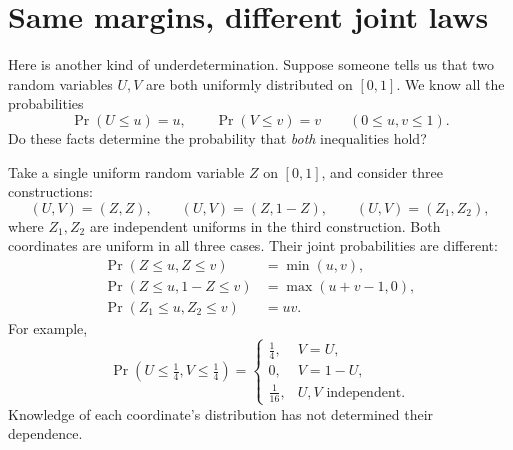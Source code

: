 \section{Same margins, different joint laws}

Here is another kind of underdetermination. Suppose someone tells us that two random variables \(U,V\) are both uniformly distributed on \([0,1]\). We know all the probabilities
\[
 \Pr(U\leq u)=u,\qquad
 \Pr(V\leq v)=v
 \qquad (0\leq u,v\leq1).
\]
Do these facts determine the probability that \emph{both} inequalities hold?

Take a single uniform random variable \(Z\) on \([0,1]\), and consider three constructions:
\begin{equation}
 (U,V)=(Z,Z),\qquad
 (U,V)=(Z,1-Z),\qquad
 (U,V)=(Z_1,Z_2),
 \label{eq:N20261105-threecouplings}
\end{equation}
where \(Z_1,Z_2\) are independent uniforms in the third construction. Both coordinates are uniform in all three cases. Their joint probabilities are different:
\begin{align*}
 \Pr(Z\leq u,Z\leq v)&=\min(u,v),\\
 \Pr(Z\leq u,1-Z\leq v)&=\max(u+v-1,0),\\
 \Pr(Z_1\leq u,Z_2\leq v)&=uv.
\end{align*}
For example,
\[
 \Pr(U\leq\tfrac14,V\leq\tfrac14)
 =\begin{cases}
 \frac14,&V=U,\\[2pt]
 0,&V=1-U,\\[2pt]
 \frac1{16},&U,V\text{ independent}.
 \end{cases}
\]
Knowledge of each coordinate's distribution has not determined their dependence.


